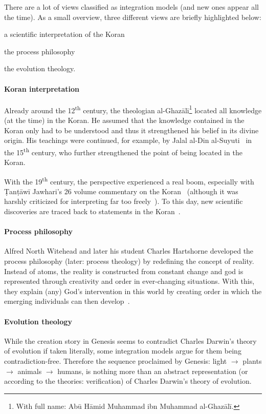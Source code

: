 There are a lot of views classified as integration models (and new ones appear all the time). As a small overview, three different views are briefly highlighted below: \begin{inlist}
    \item a scientific interpretation of the Koran
    \item the process philosophy
    \item the evolution theology.
\end{inlist}

\paragraph{Koran interpretation}
Already around the 12\textsuperscript{th} century, the theologian al-Ghazālī\footnote{With full name: Abū Hāmid Muhammad ibn Muhammad al-Ghazālī.} located all knowledge (at the time) in the Koran.
He assumed that the knowledge contained in the Koran only had to be understood and thus it strengthened his belief in its divine origin.
His teachings were continued, for example, by Jalal al-Din al-Suyuti~\cite{abdurrahman2003kecsfu} in the 15\textsuperscript{th} century, who further strengthened the point of  being located in the Koran.

With the 19\textsuperscript{th} century, the perspective experienced a real boom, especially with \d{T}an\d{t}āwī Jawhari's 26 volume commentary on the Koran~\cite{jawhari1932jawahir} (although it was harshly criticized for interpreting far too freely~\cite[p.~48]{Demirci2016}).
To this day, new scientific discoveries are traced back to statements in the Koran~\cite{Demirci2016}.

\paragraph{Process philosophy}
Alfred North Witehead and later his student Charles Hartshorne developed the process philosophy (later: process theology) by redefining the concept of reality.
Instead of atoms, the reality is constructed from constant change
and god is represented through creativity and order in ever-changing situations.
With this, they explain (any) God's intervention in this world by creating order in which the emerging individuals can then develop~\cite{whitehead1957process}.


\paragraph{Evolution theology}
While the creation story in Genesis seems to contradict Charles Darwin's theory of evolution if taken literally, some integration models argue for them being contradiction-free.
{\def\mto{\(\to\)}
Therefore the sequence proclaimed by Genesis: light \mto{} plants \mto{} animals \mto{} humans, is nothing more than an abstract representation (or according to the theories: verification) of Charles Darwin's theory of evolution.
}

